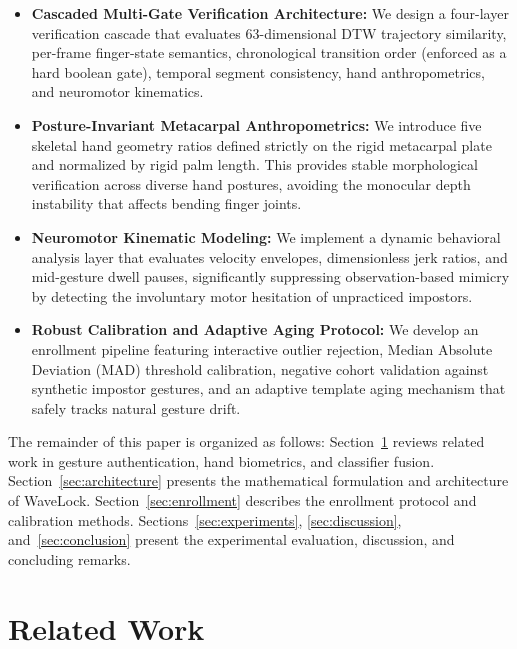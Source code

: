 \documentclass[conference]{IEEEtran}
\begin{document}
\begin{itemize}
\item \textbf{Cascaded Multi-Gate Verification Architecture:} We design a four-layer verification cascade that evaluates 63-dimensional DTW trajectory similarity, per-frame finger-state semantics, chronological transition order (enforced as a hard boolean gate), temporal segment consistency, hand anthropometrics, and neuromotor kinematics.

\item \textbf{Posture-Invariant Metacarpal Anthropometrics:} We introduce five skeletal hand geometry ratios defined strictly on the rigid metacarpal plate and normalized by rigid palm length. This provides stable morphological verification across diverse hand postures, avoiding the monocular depth instability that affects bending finger joints.

\item \textbf{Neuromotor Kinematic Modeling:} We implement a dynamic behavioral analysis layer that evaluates velocity envelopes, dimensionless jerk ratios, and mid-gesture dwell pauses, significantly suppressing observation-based mimicry by detecting the involuntary motor hesitation of unpracticed impostors.

\item \textbf{Robust Calibration and Adaptive Aging Protocol:} We develop an enrollment pipeline featuring interactive outlier rejection, Median Absolute Deviation (MAD) threshold calibration, negative cohort validation against synthetic impostor gestures, and an adaptive template aging mechanism that safely tracks natural gesture drift.
\end{itemize}

The remainder of this paper is organized as follows: Section~\ref{sec:related_work} reviews related work in gesture authentication, hand biometrics, and classifier fusion. Section~\ref{sec:architecture} presents the mathematical formulation and architecture of WaveLock. Section~\ref{sec:enrollment} describes the enrollment protocol and calibration methods. Sections~\ref{sec:experiments}, \ref{sec:discussion}, and~\ref{sec:conclusion} present the experimental evaluation, discussion, and concluding remarks.

\section{Related Work}
\label{sec:related_work}
\end{document}
